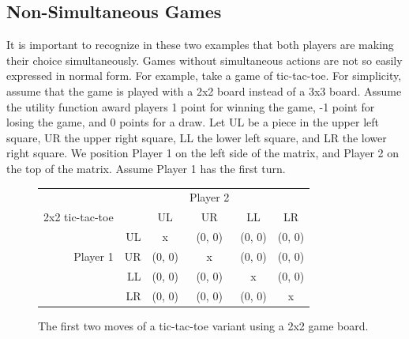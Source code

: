 \subsection{Non-Simultaneous Games}
It is important to recognize in these two examples that both players are making their choice simultaneously. Games without simultaneous actions are not so easily expressed in normal form. For example, take a game of tic-tac-toe. For simplicity, assume that the game is played with a 2x2 board instead of a 3x3 board. Assume the utility function award players 1 point for winning the game, -1 point for losing the game, and 0 points for a draw. Let UL be a piece in the upper left square, UR the upper right square, LL the lower left square, and LR the lower right square. We position Player 1 on the left side of the matrix, and Player 2 on the top of the matrix. Assume Player 1 has the first turn.\\
\begin{figure}[H]
  \centering
  \begin{tabular}{r r | c | c | c | c |}
    &\multicolumn{1}{c}{}&\multicolumn{1}{c}{}&\multicolumn{1}{c}{Player 2}&\multicolumn{1}{c}{}\\
    \multicolumn{1}{c}{2x2 tic-tac-toe}&\multicolumn{1}{c}{}&\multicolumn{1}{c}{UL}&
    \multicolumn{1}{c}{UR}&\multicolumn{1}{c}{LL}&\multicolumn{1}{c}{LR}\\ \cline{3-6}
    & UL & x & (0, 0) & (0, 0) & (0, 0) \\ \cline{3-6}
    Player 1 & UR & (0, 0) & x & (0, 0) & (0, 0) \\ \cline{3-6}
    & LL & (0, 0) & (0, 0) & x & (0, 0) \\ \cline{3-6}
    & LR & (0, 0) & (0, 0) & (0, 0) & x \\ \cline{3-6}
  \end{tabular}
  \caption{The first two moves of a tic-tac-toe variant using a 2x2 game board.}
  \label{fig:2x2TTT}
\end{figure}

